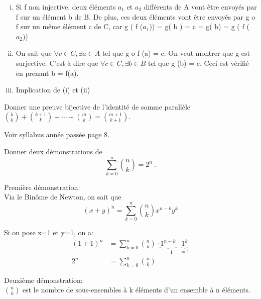 \begin{enumerate}[(i)]
	\item Si f non injective, deux éléments $a_{1}$ et $a_{2}$ différents de A vont être envoyés par f sur un élément b de B. De plus, ces deux éléments vont être envoyés par g o f sur un même élément c de C, car g ( f ($a_1$)) = g( b ) = c = g( b) = g ( f ( $a_2$))
	\item On sait que $\forall c \in C , \exists a \in A$ tel que g o f (a) = c. 
		On veut montrer que g est surjective. C'est à dire que $\forall c \in C, \exists b \in B$ tel que g (b) = c. 
		Ceci est vérifié en prenant b = f(a).
	\item Implication de (i) et (ii)
\end{enumerate}


\begin{exo}
Donner une preuve bijective de l'identit\'e de somme parall\`ele ${k \choose k} + {k+1 \choose k} + \cdots + {m \choose k} = {m+1 \choose k+1}$.
\end{exo}

Voir syllabus année passée page 8.


\begin{exo}
Donner deux d\'emonstrations de
$$
\sum_{k=0}^n {n \choose k} = 2^n\ .
$$
\end{exo}

Première démonstration: \\

Via le Binôme de Newton, on sait que\\

$$(x+y)^n = \sum_{k=0}^n {n \choose k} x^{n-k} y^k$$

Si on pose x=1 et y=1, on a: \\

\begin{align*}
 (1+1)^n &= \sum_{k=0}^n {n \choose k} \cdot \underbrace{1^{n-k}}_{=1} \cdot \underbrace{1^k}_{=1} \\
 2^n &= \sum_{k=0}^n {n \choose k}
\end{align*}

Deuxième démonstration: \\

${n \choose k}$ est le nombre de sous-ensembles à k éléments d'un ensemble à n éléments. \\


